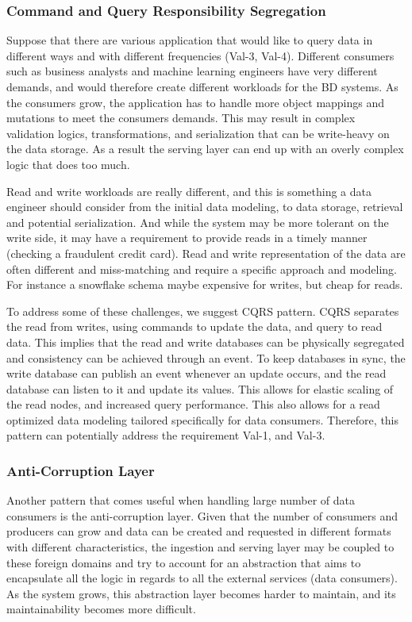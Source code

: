 \documentclass{bmcart}
\begin{document}
\subsubsection{Command and Query Responsibility Segregation}

Suppose that there are various application that would like to query data in different ways and with different frequencies (Val-3, Val-4). Different consumers such as business analysts and machine learning engineers have very different demands, and would therefore create different workloads for the BD systems. As the consumers grow, the application has to handle more object mappings and mutations to meet the consumers demands. This may result in complex validation logics, transformations, and serialization that can be write-heavy on the data storage. As a result the serving layer can end up with an overly complex logic that does too much. 

Read and write workloads are really different, and this is something a data engineer should consider from the initial data modeling, to data storage, retrieval and potential serialization. And while the system may be more tolerant on the write side, it may have a requirement to provide reads in a timely manner (checking a fraudulent credit card). Read and write representation of the data are often different and miss-matching and require a specific approach and modeling. For instance a snowflake schema maybe expensive for writes, but cheap for reads. 

To address some of these challenges, we suggest CQRS pattern. CQRS separates the read from writes, using commands to update the data, and query to read data. This implies that the read and write databases can be physically segregated and consistency can be achieved through an event. To keep databases in sync, the write database can publish an event whenever an update occurs, and the read database can listen to it and update its values. This allows for elastic scaling of the read nodes, and increased query performance. This also allows for a read optimized data modeling tailored specifically for data consumers. Therefore, this pattern can potentially address the requirement Val-1, and Val-3. 

\subsubsection{Anti-Corruption Layer}

Another pattern that comes useful when handling large number of data consumers is the anti-corruption layer. Given that the number of consumers and producers can grow and data can be created and requested in different formats with different characteristics, the ingestion and serving layer may be coupled to these foreign domains and try to account for an abstraction that aims to encapsulate all the logic in regards to all the external services (data consumers). As the system grows, this abstraction layer becomes harder to maintain, and its maintainability becomes more difficult. 
\end{document}
